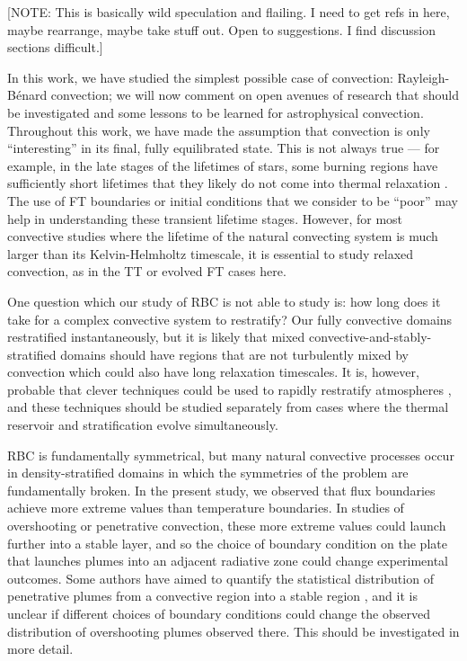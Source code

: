 \documentclass[aps, pre, onecolumn, nofootinbib, notitlepage, groupedaddress, amsfonts, amssymb, amsmath, longbibliography, superscriptaddress]{revtex4-1}
\newcommand{\RB}{Rayleigh-B\'{e}nard }
\begin{document}
[NOTE: This is basically wild speculation and flailing. I need to get refs in here, maybe rearrange, maybe take stuff out. Open to suggestions. I find discussion sections difficult.]

In this work, we have studied the simplest possible case of convection: \RB convection; we will now comment on open avenues of research that should be investigated and some lessons to be learned for astrophysical convection.
Throughout this work, we have made the assumption that convection is only ``interesting'' in its final, fully equilibrated state.
This is not always true --- for example, in the late stages of the lifetimes of stars, some burning regions have sufficiently short lifetimes that they likely do not come into thermal relaxation \citep{clarkson&all2018, andrassy&all2020}.
The use of FT boundaries or initial conditions that we consider to be ``poor'' may help in understanding these transient lifetime stages.
However, for most convective studies where the lifetime of the natural convecting system is much larger than its Kelvin-Helmholtz timescale, it is essential to study relaxed convection, as in the TT or evolved FT cases here.

One question which our study of RBC is not able to study is: how long does it take for a complex convective system to restratify?
Our fully convective domains restratified instantaneously, but it is likely that mixed convective-and-stably-stratified domains \citep{brummell&all2002, kapyla&all2019, pratt&all2017, korre&all2019} should have regions that are not turbulently mixed by convection which could also have long relaxation timescales.
It is, however, probable that clever techniques could be used to rapidly restratify atmospheres \cite{anders&all2018}, and these techniques should be studied separately from cases where the thermal reservoir and stratification evolve simultaneously.

RBC is fundamentally symmetrical, but many natural convective processes occur in density-stratified domains in which the symmetries of the problem are fundamentally broken.
In the present study, we observed that flux boundaries achieve more extreme values than temperature boundaries.
In studies of overshooting or penetrative convection, these more extreme values could launch further into a stable layer, and so the choice of boundary condition on the plate that launches plumes into an adjacent radiative zone could change experimental outcomes.
Some authors have aimed to quantify the statistical distribution of penetrative plumes from a convective region into a stable region \cite{pratt&all2017, korre&all2019}, and it is unclear if different choices of boundary conditions could change the observed distribution of overshooting plumes observed there.
This should be investigated in more detail.
\end{document}
